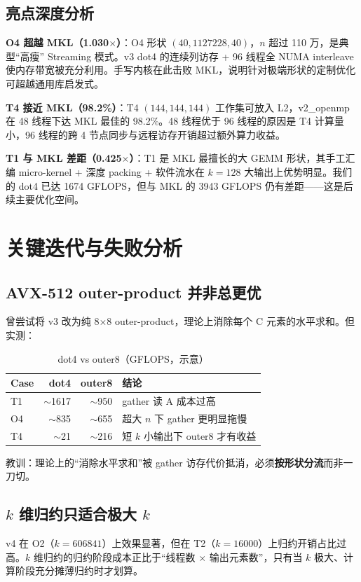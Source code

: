 \documentclass[11pt,a4paper,fontset=fandol]{ctexart}
\begin{document}
\subsection{亮点深度分析}
\textbf{O4 超越 MKL（1.030$\times$）}：O4 形状 $(40,1127228,40)$，$n$ 超过 110 万，是典型“高瘦” Streaming 模式。v3 dot4 的连续列访存 + 96 线程全 NUMA interleave 使内存带宽被充分利用。手写内核在此击败 MKL，说明针对极端形状的定制优化可超越通用库启发式。

\textbf{T4 接近 MKL（98.2\%）}：T4 $(144,144,144)$ 工作集可放入 L2，v2\_openmp 在 48 线程下达 MKL 最佳的 98.2\%。48 线程优于 96 线程的原因是 T4 计算量小，96 线程的跨 4 节点同步与远程访存开销超过额外算力收益。

\textbf{T1 与 MKL 差距（0.425$\times$）}：T1 是 MKL 最擅长的大 GEMM 形状，其手工汇编 micro-kernel + 深度 packing + 软件流水在 $k=128$ 大输出上优势明显。我们的 dot4 已达 1674 GFLOPS，但与 MKL 的 3943 GFLOPS 仍有差距——这是后续主要优化空间。

\section{关键迭代与失败分析}

\subsection{AVX-512 outer-product 并非总更优}
曾尝试将 v3 改为纯 8$\times$8 outer-product，理论上消除每个 C 元素的水平求和。但实测：
\begin{table}[H]
\centering
\caption{dot4 vs outer8（GFLOPS，示意）}
\small
\begin{tabular}{lrrl}
\toprule
Case & dot4 & outer8 & 结论 \\
\midrule
T1 & $\sim$1617 & $\sim$950 & gather 读 A 成本过高 \\
O4 & $\sim$835 & $\sim$655 & 超大 $n$ 下 gather 更明显拖慢 \\
T4 & $\sim$21 & $\sim$216 & 短 $k$ 小输出下 outer8 才有收益 \\
\bottomrule
\end{tabular}
\end{table}
教训：理论上的“消除水平求和”被 gather 访存代价抵消，必须\textbf{按形状分流}而非一刀切。

\subsection{$k$ 维归约只适合极大 $k$}
v4 在 O2（$k=606841$）上效果显著，但在 T2（$k=16000$）上归约开销占比过高。$k$ 维归约的归约阶段成本正比于“线程数 $\times$ 输出元素数”，只有当 $k$ 极大、计算阶段充分摊薄归约时才划算。
\end{document}
